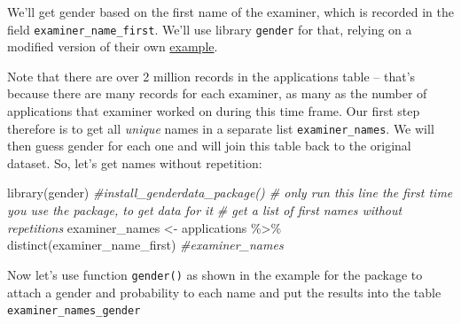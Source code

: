 \documentclass[
]{article}
\newenvironment{Shaded}{\begin{snugshade}}{\end{snugshade}}
\newcommand{\AttributeTok}[1]{\textcolor[rgb]{0.77,0.63,0.00}{#1}}
\newcommand{\CommentTok}[1]{\textcolor[rgb]{0.56,0.35,0.01}{\textit{#1}}}
\newcommand{\ConstantTok}[1]{\textcolor[rgb]{0.00,0.00,0.00}{#1}}
\newcommand{\FunctionTok}[1]{\textcolor[rgb]{0.00,0.00,0.00}{#1}}
\newcommand{\NormalTok}[1]{#1}
\newcommand{\OtherTok}[1]{\textcolor[rgb]{0.56,0.35,0.01}{#1}}
\newcommand{\SpecialCharTok}[1]{\textcolor[rgb]{0.00,0.00,0.00}{#1}}
\newcommand{\StringTok}[1]{\textcolor[rgb]{0.31,0.60,0.02}{#1}}
\begin{document}
We'll get gender based on the first name of the examiner, which is
recorded in the field \texttt{examiner\_name\_first}. We'll use library
\texttt{gender} for that, relying on a modified version of their own
\href{https://cran.r-project.org/web/packages/gender/vignettes/predicting-gender.html}{example}.

Note that there are over 2 million records in the applications table --
that's because there are many records for each examiner, as many as the
number of applications that examiner worked on during this time frame.
Our first step therefore is to get all \emph{unique} names in a separate
list \texttt{examiner\_names}. We will then guess gender for each one
and will join this table back to the original dataset. So, let's get
names without repetition:

\begin{Shaded}
\begin{Highlighting}[]
\FunctionTok{library}\NormalTok{(gender)}
\CommentTok{\#install\_genderdata\_package() \# only run this line the first time you use the package, to get data for it}
\CommentTok{\# get a list of first names without repetitions}
\NormalTok{examiner\_names }\OtherTok{\textless{}{-}}\NormalTok{ applications }\SpecialCharTok{\%\textgreater{}\%} 
  \FunctionTok{distinct}\NormalTok{(examiner\_name\_first)}
\CommentTok{\#examiner\_names}
\end{Highlighting}
\end{Shaded}

Now let's use function \texttt{gender()} as shown in the example for the
package to attach a gender and probability to each name and put the
results into the table \texttt{examiner\_names\_gender}

\begin{Shaded}
\end{Shaded}
\end{document}
